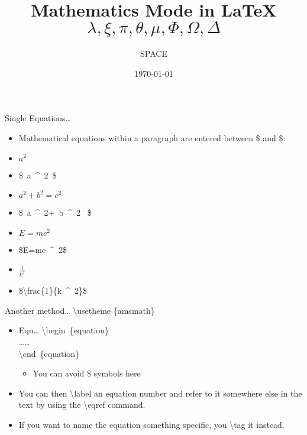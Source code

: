 \documentclass{beamer}
\title{Mathematics Mode in \LaTeX \\ $\lambda,\xi,\pi,\theta,
 \mu,\Phi,\Omega,\Delta$}
\author{SPACE}
\date{\today}
\begin{document}
\maketitle
\begin{frame}{Single Equations\ldots}
\begin{itemize}
\pause \item Mathematical equations within a paragraph are entered between \$
and \$:
\pause \item $a^2$
\pause \item[] \$~a~\^~2~\$
\pause \item $a^2 + b^2 = c^2$
\pause \item[] \$~a~\^~2+~b~\^~2~ \$
\pause \item $E=mc^2$
\pause \item[] \$E=mc~\^~2\$
\pause \item $\frac{1}{k^2}$
\pause \item[] \$\textbackslash frac\{1\}\{k~\^~2\}\$
\end{itemize}
\end{frame}

\begin{frame}{Another method\ldots}
\textbackslash usetheme \{amsmath\}
\begin{itemize}
\pause\item[]\begin{block}{Eqn\ldots}
\textbackslash begin~\{equation\}\\
\ldots \ldots\\
\textbackslash end~\{equation\}
\begin{itemize}
\pause \item You can avoid \$ symbols here
\end{itemize}
\end{block}
\pause\item You can then \textbackslash label an equation number and refer to it
somewhere else in the text by using the \textbackslash eqref command.
\pause \item If you want to name the equation something specific, you \textbackslash tag it instead.
\end{itemize}
\end{frame}
\end{document}
